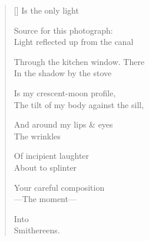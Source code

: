 \label{ch:venezia}
\settowidth{\versewidth}{The tilt of my body against the sill,}
\begin{verse}[\versewidth]
\hspace*{2\vgap} Is the only light

Source for this photograph:\\
Light reflected up from the canal

Through the kitchen window. \qquad There\\
In the shadow by the stove

Is my crescent-moon profile,\\
The tilt of my body against the sill,

And around my lips \& eyes\\
The wrinkles

Of incipient laughter\\
About to splinter

Your careful composition\\
---The moment---

\hspace*{3\vgap} Into\\
Smithereens.
\end{verse}
